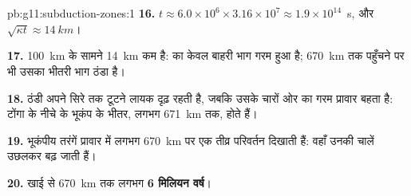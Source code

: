 \begin{solution}{pb:g11:subduction-zones:1}
\textbf{16.} $t \approx 6.0 \times 10^6 \times 3.16 \times 10^7 \approx
1.9 \times 10^{14}$~s, और $\sqrt{\kappa t} \approx \qty{14}{km}$।

\textbf{17.} \qty{100}{km} के सामने \qty{14}{km} कम है:  का केवल बाहरी भाग
गरम हुआ है; \qty{670}{km} तक पहुँचने पर भी उसका भीतरी भाग
ठंडा है।

\textbf{18.} ठंडी  अपने सिरे तक टूटने लायक दृढ़ रहती है,
जबकि उसके चारों ओर का गरम प्रावार बहता है: टोंगा के नीचे के भूकंप
 के भीतर, लगभग \qty{671}{km} तक, होते हैं।

\textbf{19.} भूकंपीय तरंगें प्रावार में लगभग \qty{670}{km} पर एक तीव्र
परिवर्तन दिखाती हैं: वहाँ उनकी चालें उछलकर बढ़ जाती हैं।

\textbf{20.} खाई से \qty{670}{km} तक लगभग \textbf{6 मिलियन वर्ष}।
\end{solution}
